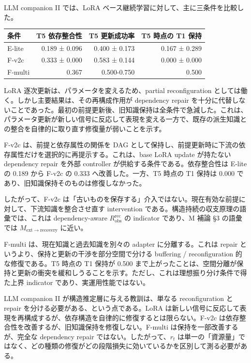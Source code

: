 \documentclass[12pt,a4paper]{article}
\begin{document}
LLM companion II では、LoRA ベース継続学習に対して、主に三条件を比較した。

{\def\LTcaptype{table} %
\begin{longtable}[]{@{}lrrr@{}}
\toprule\noalign{}
条件 & T5 依存整合性 & T5 更新成功率 & T5 時点の T1 保持 \\
\midrule\noalign{}
\endhead
\bottomrule\noalign{}
\endlastfoot
E-lite & 0.189 ± 0.096 & 0.400 ± 0.173 & 0.167 ± 0.289 \\
F-v2c & 0.333 ± 0.000 & 0.583 ± 0.144 & 0.000 ± 0.000 \\
F-multi & 0.367 & 0.500-0.750 & 0.500 \\
\end{longtable}
}

LoRA 逐次更新は、パラメータを変えるため、partial reconfiguration としては働く。しかし主要結果は、その再構成作用が dependency repair を十分に代替しないことであった。最初の前提更新後、旧知識保持は全条件で急減した。これは、パラメータ更新が新しい信号に反応して表現を変える一方で、既存の派生知識との整合を自律的に取り直す修復量が弱いことを示す。

F-v2c は、前提と依存属性の関係を DAG として保持し、前提更新時に下流の依存属性だけを選択的に再提示する。これは、base LoRA update が持たない dependency repair を外部 controller が供給する条件である。依存整合性は E-lite の 0.189 から F-v2c の 0.333 へ改善した。一方、T5 時点の T1 保持は 0.000 であり、旧知識保持そのものは修復しなかった。

したがって、F-v2c は「古いものを保存する」介入ではない。現在有効な前提に対して、下流知識を整合させ直す intervention である。構造持続の収支原理の語彙では、これは dependency-aware \(R_{\mathrm{obs}}^{\mathrm{rec}}\) の indicator であり、M 補論 §3 の語彙では \(M_{\mathrm{ext}\to\mathrm{recovery}}\) に近い。

F-multi は、現在知識と過去知識を別々の adapter に分離する。これは repair というより、保持と更新の干渉を部分空間で分ける buffering / reconfiguration 的な修復である。T5 時点の T1 保持が 0.500 まで上がったことは、空間分離が保持と更新の衝突を緩和しうることを示す。ただし、これは理想振り分け条件で得た上界 indicator であり、実運用性能ではない。

LLM companion II が構造推定層に与える教訓は、単なる reconfiguration と repair を分ける必要がある、という点である。LoRA は新しい信号に反応して表現を再構成するが、依存構造を自律的に修復するとは限らない。F-v2c は依存整合性を改善するが、旧知識保持を修復しない。F-multi は保持を一部改善するが、完全な dependency repair ではない。したがって、\(r_{t}\) は単一の「資源量」ではなく、どの種類の修復がどの段階損失に効いているかを区別して測る必要がある。
\end{document}
